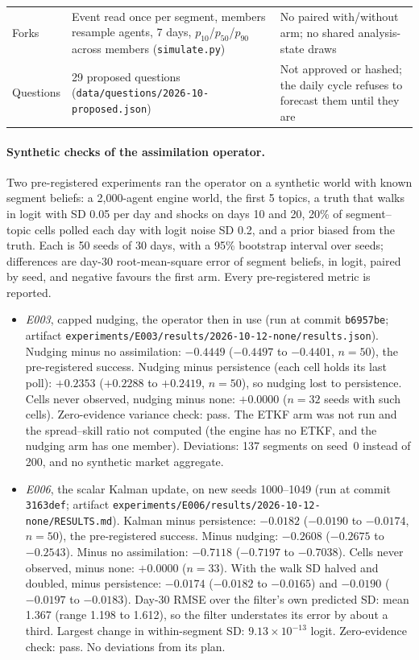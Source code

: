 \documentclass[11pt]{article}
\begin{document}
\begin{table}[htbp]
\begin{tabular}{@{}L{2.3cm}L{6.2cm}L{5.6cm}@{}}
Forks & Event read once per segment, members resample agents, 7 days, $p_{10}$/$p_{50}$/$p_{90}$ across members (\nolinkurl{simulate.py}) & No paired with/without arm; no shared analysis-state draws \\
Questions & 29 proposed questions (\nolinkurl{data/questions/2026-10-proposed.json}) & Not approved or hashed; the daily cycle refuses to forecast them until they are \\
\bottomrule
\end{tabular}
\end{table}

\paragraph{Synthetic checks of the assimilation operator.} Two pre-registered experiments ran the operator on a synthetic world with known segment beliefs: a 2,000-agent engine world, the first 5 topics, a truth that walks in logit with SD 0.05 per day and shocks on days 10 and 20, 20\% of segment--topic cells polled each day with logit noise SD 0.2, and a prior biased from the truth. Each is 50 seeds of 30 days, with a 95\% bootstrap interval over seeds; differences are day-30 root-mean-square error of segment beliefs, in logit, paired by seed, and negative favours the first arm. Every pre-registered metric is reported.
\begin{itemize}
  \item \emph{E003}, capped nudging, the operator then in use (run at commit \texttt{b6957be}; artifact \nolinkurl{experiments/E003/results/2026-10-12-none/results.json}). Nudging minus no assimilation: $-0.4449$ ($-0.4497$ to $-0.4401$, $n=50$), the pre-registered success. Nudging minus persistence (each cell holds its last poll): $+0.2353$ ($+0.2288$ to $+0.2419$, $n=50$), so nudging lost to persistence. Cells never observed, nudging minus none: $+0.0000$ ($n=32$ seeds with such cells). Zero-evidence variance check: pass. The ETKF arm was not run and the spread--skill ratio not computed (the engine has no ETKF, and the nudging arm has one member). Deviations: 137 segments on seed~0 instead of 200, and no synthetic market aggregate.
  \item \emph{E006}, the scalar Kalman update, on new seeds 1000--1049 (run at commit \texttt{3163def}; artifact \nolinkurl{experiments/E006/results/2026-10-12-none/RESULTS.md}). Kalman minus persistence: $-0.0182$ ($-0.0190$ to $-0.0174$, $n=50$), the pre-registered success. Minus nudging: $-0.2608$ ($-0.2675$ to $-0.2543$). Minus no assimilation: $-0.7118$ ($-0.7197$ to $-0.7038$). Cells never observed, minus none: $+0.0000$ ($n=33$). With the walk SD halved and doubled, minus persistence: $-0.0174$ ($-0.0182$ to $-0.0165$) and $-0.0190$ ($-0.0197$ to $-0.0183$). Day-30 RMSE over the filter's own predicted SD: mean 1.367 (range 1.198 to 1.612), so the filter understates its error by about a third. Largest change in within-segment SD: $9.13\times10^{-13}$ logit. Zero-evidence check: pass. No deviations from its plan.
\end{itemize}
\end{document}
